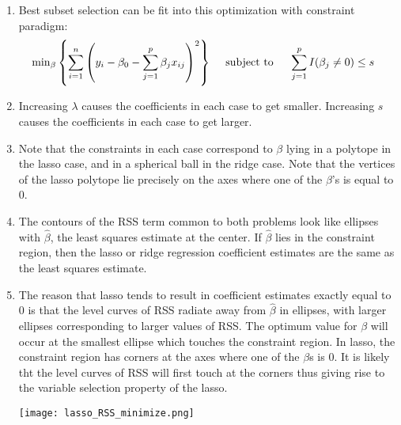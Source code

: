 \documentclass[10pt]{article}
\begin{document}
\begin{enumerate}
{	}
	\item Best subset selection can be fit into this optimization with constraint paradigm: 
	\begin{align*}
		\mathrm{min}_\beta \left\{ \sum_{i = 1}^n \left( y_i - \beta_0 - \sum_{j = 1}^p \beta_j x_{ij} \right)^2 \right\} \hspace{.2in} &\text{subject to} \hspace{.2in} \sum_{j = 1}^p I(\beta_j \neq 0) \leq s 
	\end{align*}
	\item Increasing $\lambda$ causes the coefficients in each case to get smaller.  Increasing $s$ causes the coefficients in each case to get larger.
	\item Note that the constraints in each case correspond to $\beta$ lying in a polytope in the lasso case, and in a spherical ball in the ridge case.  Note that the vertices of the lasso polytope lie precisely on the axes where one of the $\beta$'s is equal to 0.
	\item The contours of the RSS term common to both problems look like ellipses with $\hat \beta$, the least squares estimate at the center.  If $\hat \beta$ lies in the constraint region, then the lasso or ridge regression coefficient estimates are the same as the least squares estimate.
	\item The reason that lasso tends to result in coefficient estimates exactly equal to 0 is that the level curves of RSS radiate away from $\hat \beta$ in ellipses, with larger ellipses corresponding to larger values of RSS.  The optimum value for $\beta$ will occur at the smallest ellipse which touches the constraint region.  In lasso, the constraint region has corners at the axes where one of the $\beta$s is 0.  It is likely tht the level curves of RSS will first touch at the corners thus giving rise to the variable selection property of the lasso.

	\texttt{[image: lasso\_RSS\_minimize.png]}


\end{enumerate}
\end{document}
